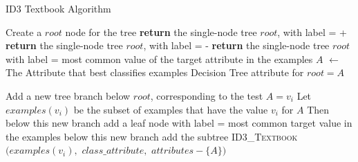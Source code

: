 \begin{algorithm}[H]
\caption{ID3 Textbook Algorithm }\label{a:id3-simple}
\begin{algorithmic}[1]

    \State Create a $root$ node for the tree
        \State \textbf{return} the single-node tree $root$, with label = +
        \State \textbf{return} the single-node tree $root$, with label = -
        \State \textbf{return} the single-node tree $root$ with label = most common value of the target attribute in the examples
    \Else
        \State $A$ $\gets$ The Attribute that best classifies examples
        \State Decision Tree attribute for $root = A$

            \State Add a new tree branch below $root$, corresponding to the test $A = v_i$
            \State Let $examples(v_i)$ be the subset of examples that have the value $v_i$ for $A$
                \State Then below this new branch add a leaf node with label = most common target value in the examples
            \Else
                \State below this new branch add the subtree \textsc{ID3\_Textbook}$(examples(v_i),$ $class\_attribute,$ $attributes - \{A\})$
            \EndIf
        \EndFor
    \EndIf
\EndProcedure

\end{algorithmic}
\end{algorithm}
